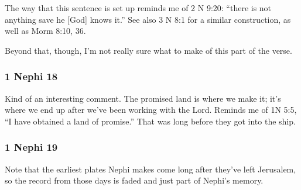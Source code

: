 \begin{compactdesc}
		\item[31$\vert$]
		\begin{compactdesc}
		\item[there was not any thing done save it were by his word] The way that this sentence is set up reminds me of 2 N 9:20: ``there is not anything save he [God] knows it.'' See also 3 N 8:1 for a similar construction, as well as Morm 8:10, 36.

		Beyond that, though, I'm not really sure what to make of this part of the verse. 
		\end{compactdesc}

		\end{compactdesc}
		
	\subsubsection{1 Nephi 18} %
	
		\begin{compactdesc}
		
		\item[23$\vert$]
		\begin{compactdesc}
		\item[and we did call it the promised land] Kind of an interesting comment. The promised land is where we make it; it's where we end up after we've been working with the Lord. Reminds me of 1N 5:5, ``I have obtained a land of promise.'' That was long before they got into the ship.
		\end{compactdesc}
		
		\end{compactdesc}
		
	\subsubsection{1 Nephi 19} %
	
		\begin{compactdesc}
		
		\item[2--6$\vert$]
		\begin{compactdesc}
		\item[the plates] Note that the earliest plates Nephi makes come long after they've left Jerusalem, so the record from those days is faded and just part of Nephi's memory.
		\end{compactdesc}
		
		\end{compactdesc}

